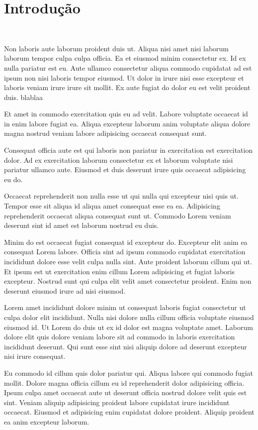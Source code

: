\documentclass{article}
\begin{document}
\section{Introdução}\

Non laboris aute laborum proident duis ut. Aliqua nisi amet nisi laborum laborum tempor culpa culpa officia. Ea et eiusmod minim consectetur ex. Id ex nulla pariatur est eu. Aute ullamco consectetur aliqua commodo cupidatat ad est ipsum non nisi laboris tempor eiusmod. Ut dolor in irure nisi esse excepteur et laboris veniam irure irure sit mollit. Ex aute fugiat do dolor eu est velit proident duis. blablaa

Et amet in commodo exercitation quis eu ad velit. Labore voluptate occaecat id in enim labore fugiat ea. Aliqua excepteur laborum anim voluptate aliqua dolore magna nostrud veniam labore adipisicing occaecat consequat sunt.

Consequat officia aute est qui laboris non pariatur in exercitation est exercitation dolor. Ad ex exercitation laborum consectetur ex et laborum voluptate nisi pariatur ullamco aute. Eiusmod et duis deserunt irure quis occaecat adipisicing eu do.

Occaecat reprehenderit non nulla esse ut qui nulla qui excepteur nisi quis ut. Tempor esse sit aliqua id aliqua amet consequat esse ea ea. Adipisicing reprehenderit occaecat aliqua consequat sunt ut. Commodo Lorem veniam deserunt sint id amet est laborum nostrud eu duis.

Minim do est occaecat fugiat consequat id excepteur do. Excepteur elit anim ea consequat Lorem labore. Officia sint ad ipsum commodo cupidatat exercitation incididunt dolore esse velit culpa nulla sint. Aute proident laborum cillum qui ut. Et ipsum est ut exercitation enim cillum Lorem adipisicing et fugiat laboris excepteur. Nostrud sunt qui culpa elit velit amet consectetur proident. Enim non deserunt eiusmod irure ad nisi eiusmod.

Lorem amet incididunt dolore minim ut consequat laboris fugiat consectetur ut culpa dolor elit incididunt. Nulla nisi dolore nulla cillum officia voluptate eiusmod eiusmod id. Ut Lorem do duis ut ex id dolor est magna voluptate amet. Laborum dolore elit quis dolore veniam labore sit ad commodo in laboris exercitation incididunt deserunt. Qui sunt esse sint nisi aliquip dolore ad deserunt excepteur nisi irure consequat.

Eu commodo id cillum quis dolor pariatur qui. Aliqua labore qui commodo fugiat mollit. Dolore magna officia cillum eu id reprehenderit dolor adipisicing officia. Ipsum culpa amet occaecat aute ut deserunt officia nostrud dolore velit quis est sint. Veniam aliquip adipisicing proident labore cupidatat irure incididunt occaecat. Eiusmod et adipisicing enim cupidatat dolore proident. Aliquip proident ea anim excepteur laborum.
\end{document}
